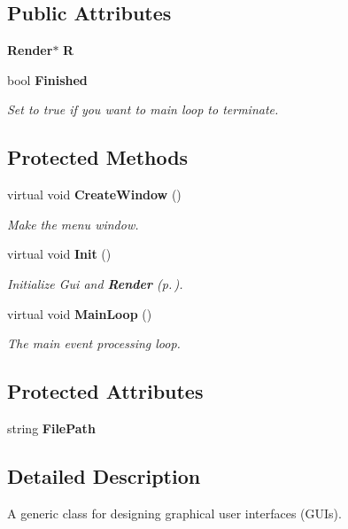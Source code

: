 \subsection*{Public Attributes}
\begin{CompactItemize}
\item 
{\bf Render}$\ast$ {\bf R}
\item 
bool {\bf Finished}
\begin{CompactList}\small\item\em Set to true if you want to main loop to terminate.\item\end{CompactList}\end{CompactItemize}
\subsection*{Protected Methods}
\begin{CompactItemize}
\item 
virtual void {\bf Create\-Window} ()
\begin{CompactList}\small\item\em Make the menu window.\item\end{CompactList}\item 
virtual void {\bf Init} ()
\begin{CompactList}\small\item\em Initialize Gui and {\bf Render} {\rm (p.\,\pageref{classRender})}.\item\end{CompactList}\item 
virtual void {\bf Main\-Loop} ()
\begin{CompactList}\small\item\em The main event processing loop.\item\end{CompactList}\end{CompactItemize}
\subsection*{Protected Attributes}
\begin{CompactItemize}
\item 
string {\bf File\-Path}
\end{CompactItemize}


\subsection{Detailed Description}
A generic class for designing graphical user interfaces (GUIs).

